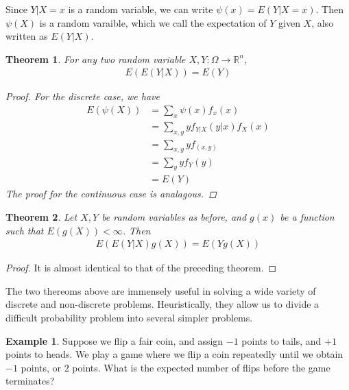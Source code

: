 \documentclass[12pt]{article}
\newcommand{\rr}{\mathbb{R}}
\theoremstyle{plain}
\newtheorem{theorem}{Theorem}
\theoremstyle{definition}
\newtheorem*{example}{Example}
\theoremstyle{remark}
\numberwithin{equation}{section}  %
\begin{document}
Since $Y|X =x$ is a random variable, we can write $\psi(x) = E(Y | X =x)$.
Then $\psi(X)$ is a random varaible, which we call the expectation of $Y$ given
$X$, also written as $E(Y|X)$.
\begin{theorem}
For any two random variable $X,Y: \Omega \to \rr^n$,
\begin{align*}
E(E(Y | X)) = E(Y)
\end{align*}
\begin{proof}
For the discrete case, we have
\begin{align*}
E(\psi(X)) 
& = \sum_{x} \psi(x) f_x(x)
\\
& = \sum_{x,y} y f_{Y|X}(y|x) f_X(x)
\\
& = \sum_{x,y} y f_{(x,y)}
\\
& = \sum_y y f_Y(y)
\\
& = E(Y)
\end{align*}
The proof for the continuous case is analagous. 
\end{proof}
\end{theorem}
\begin{theorem}
Let $X,Y$ be random variables as before, and $g(x)$ be a function such that
$E(g(X))< \infty$. Then
\begin{align*}
E(E(Y|X)g(X)) = E(Yg(X))
\end{align*}
\end{theorem}
\begin{proof}
It is almost identical to that of the preceding theorem.
\end{proof}
The two thereoms above are immensely useful in solving a wide variety of
discrete and non-discrete problems. Heuristically, they allow us to divide a
difficult probability problem into several simpler problems.

\begin{example}
Suppose we flip a fair coin, and assign $-1$ points to tails, and $+1$ points to
heads. We play a game where we flip a coin repeatedly until we obtain
$-1$ points, or $2$ points. What is the expected number of flips before the
game terminates? 
\end{example}
\end{document}
